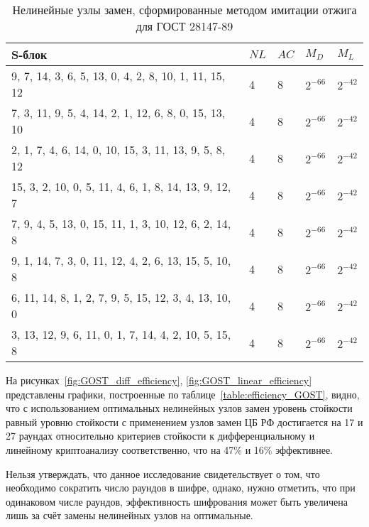 \begin{table}[ht]
    \caption{Нелинейные узлы замен, сформированные методом имитации отжига для ГОСТ 28147-89}
    \label{table:simulated_annealing_sboxes_for_GOST}
    \centering\begin{tabular}{| m{5.3cm} | m{2cm} | m{2cm} | m{2.75cm} | m{2.75cm} |}
        \hline
        S-блок                                                  & $NL$  & $AC$  & $M_D$         & $M_L$         \\ \hline
        9, 7, 14, 3, 6, 5, 13, 0, 4, 2, 8, 10, 1, 11, 15, 12    & 4     & 8     & $2^{-66}$     & $2^{-42}$     \\ \hline
        7, 3, 11, 9, 5, 4, 14, 2, 1, 12, 6, 8, 0, 15, 13, 10    & 4     & 8     & $2^{-66}$     & $2^{-42}$     \\ \hline
        2, 1, 7, 4, 6, 14, 0, 10, 15, 3, 11, 13, 9, 5, 8, 12    & 4     & 8     & $2^{-66}$     & $2^{-42}$     \\ \hline
        15, 3, 2, 10, 0, 5, 11, 4, 6, 1, 8, 14, 13, 9, 12, 7    & 4     & 8     & $2^{-66}$     & $2^{-42}$     \\ \hline
        7, 9, 4, 5, 13, 0, 15, 11, 1, 3, 10, 12, 6, 2, 14, 8    & 4     & 8     & $2^{-66}$     & $2^{-42}$     \\ \hline
        9, 1, 14, 7, 3, 0, 11, 12, 4, 2, 6, 13, 15, 5, 10, 8    & 4     & 8     & $2^{-66}$     & $2^{-42}$     \\ \hline
        6, 11, 14, 8, 1, 2, 7, 9, 5, 15, 12, 3, 4, 13, 10, 0    & 4     & 8     & $2^{-66}$     & $2^{-42}$     \\ \hline
        3, 13, 12, 9, 6, 11, 0, 1, 7, 14, 4, 2, 10, 5, 15, 8    & 4     & 8     & $2^{-66}$     & $2^{-42}$     \\ \hline
    \end{tabular}
\end{table}

На рисунках~\ref{fig:GOST_diff_efficiency}, \ref{fig:GOST_linear_efficiency}
представлены графики, построенные по таблице~\ref{table:efficiency_GOST}, видно,
что с использованием оптимальных нелинейных узлов замен уровень стойкости равный
уровню стойкости с применением узлов замен ЦБ РФ достигается на 17 и 27 раундах
относительно критериев стойкости к дифференциальному и линейному криптоанализу
соответственно, что на 47\% и 16\% эффективнее.

Нельзя утверждать, что данное исследование свидетельствует о том, что необходимо
сократить число раундов в шифре, однако, нужно отметить, что при одинаковом
числе раундов, эффективность шифрования может быть увеличена лишь за счёт замены
нелинейных узлов на оптимальные.


